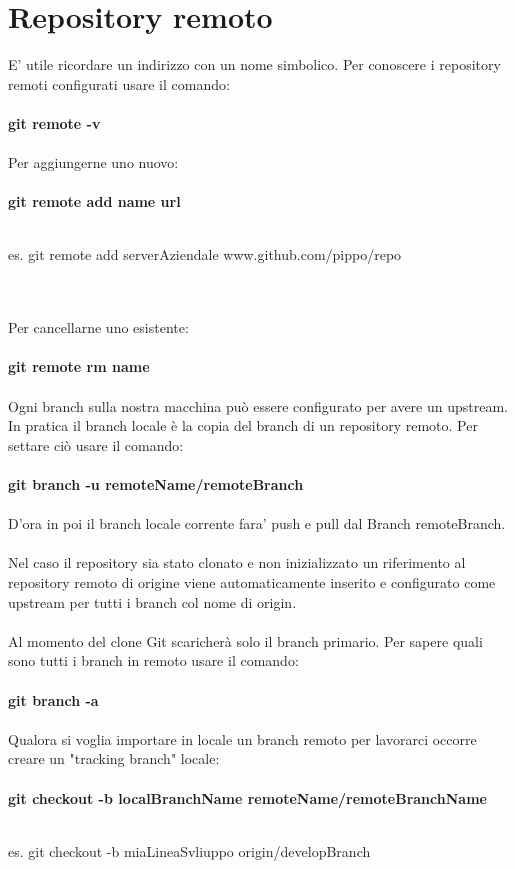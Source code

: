 \documentclass[a4paper,12pt]{report}
\begin{document}
\section{Repository remoto}
E' utile ricordare un indirizzo con un nome simbolico. 
Per conoscere i repository remoti configurati usare il comando:
\\\\
\textbf{git remote -v}
\\\\
Per aggiungerne uno nuovo:
\\\\
\textbf{git remote add name url}
\\\\
\centerline{es. git remote add serverAziendale www.github.com/pippo/repo}
\\\\
Per cancellarne uno esistente:
\\\\
\textbf{git remote rm name}
\\\\
Ogni branch sulla nostra macchina può essere configurato per avere un upstream. In pratica il branch locale è la copia del branch di un repository remoto.
Per settare ciò usare il comando:
\\\\
\textbf{git branch -u remoteName/remoteBranch}
\\\\
D'ora in poi il branch locale corrente fara' push e pull dal Branch remoteBranch.
\\\\
Nel caso il repository sia stato clonato e non inizializzato un riferimento al repository remoto di origine viene automaticamente inserito e configurato come upstream per tutti i branch col nome di origin.
\\\\
Al momento del clone Git scaricherà solo il branch primario.
Per sapere quali sono tutti i branch in remoto usare il comando:
\\\\
\textbf{git branch -a}
\\\\
Qualora si voglia importare in locale un branch remoto per lavorarci occorre creare un "tracking branch" locale:
\\\\
\textbf{git checkout -b localBranchName remoteName/remoteBranchName}
\\\\
\centerline{es. git checkout -b miaLineaSvliuppo origin/developBranch}
\end{document}
